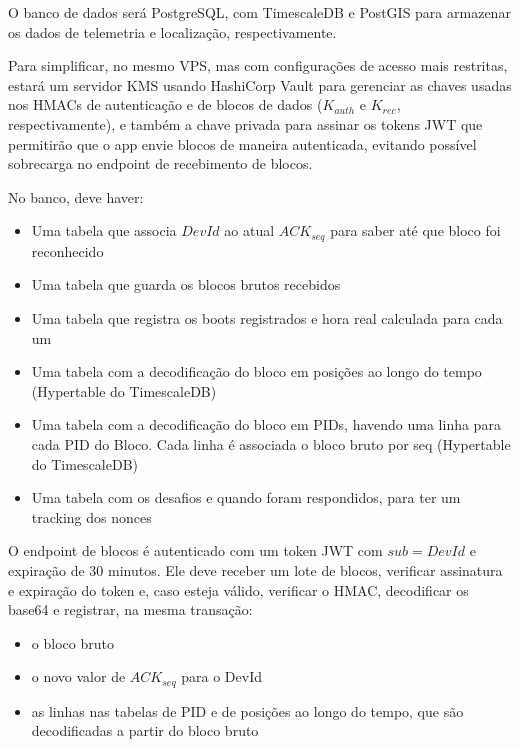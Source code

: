 \documentclass[
	12pt,
	article,			%
	oneside,
	a4paper,
	english,
	brazil				%
	]{abntex2}
\begin{document}
O banco de dados será PostgreSQL, com TimescaleDB e PostGIS para armazenar os dados de telemetria e localização, respectivamente.

Para simplificar, no mesmo VPS, mas com configurações de acesso mais restritas, estará um servidor KMS usando HashiCorp Vault para gerenciar as
chaves usadas nos HMACs de autenticação e de blocos de dados ($K_{auth}$ e $K_{rec}$, respectivamente), e também a chave privada para assinar os
tokens JWT que permitirão que o app envie blocos de maneira autenticada, evitando possível sobrecarga no endpoint de recebimento de blocos. 

No banco, deve haver:

\begin{itemize}
	\item Uma tabela que associa $DevId$ ao atual $ACK_{seq}$ para saber até que bloco foi reconhecido
	\item Uma tabela que guarda os blocos brutos recebidos
	\item Uma tabela que registra os boots registrados e hora real calculada para cada um
	\item Uma tabela com a decodificação do bloco em posições ao longo do tempo (Hypertable do TimescaleDB)
	\item Uma tabela com a decodificação do bloco em PIDs, havendo uma linha para cada PID do Bloco. Cada linha é associada o bloco bruto por seq (Hypertable do TimescaleDB)
	\item Uma tabela com os desafios e quando foram respondidos, para ter um tracking dos nonces
\end{itemize}

O endpoint de blocos é autenticado com um token JWT com $sub=DevId$ e expiração de 30 minutos. Ele deve receber um lote de blocos,
verificar assinatura e expiração do token e, caso esteja válido, verificar o HMAC, decodificar os base64 e registrar, na mesma transação:

\begin{itemize}
	\item o bloco bruto
	\item o novo valor de $ACK_{seq}$ para o DevId
	\item as linhas nas tabelas de PID e de posições ao longo do tempo, que são decodificadas a partir do bloco bruto
\end{itemize}




\postextual


\end{document}
